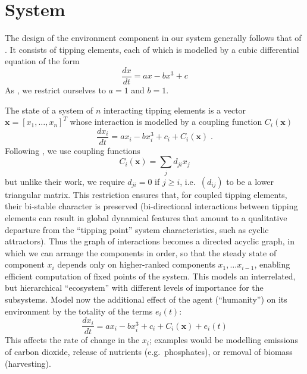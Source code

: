 \documentclass[letterpaper]{article}
\newcommand{\vectorsym}[1]{\ensuremath{\mathbf{#1}}}
\newcommand{\agentimpact}{\ensuremath{e}}
\begin{document}
\section{System}

The design of the environment component in our system generally
follows that of \citet{Klose2019_interactingtippingelements}. It consists of
tipping elements, each of which is modelled by a cubic differential equation of the
form
\begin{equation}
  \label{eq_cubic}
  \frac{dx}{dt} = ax - bx^3 + c
\end{equation}
As \citet{Klose2019_interactingtippingelements}, we restrict
ourselves to $a = 1$ and $b = 1$.

The state of a system of $n$ interacting tipping elements is a vector
$\vectorsym{x} = [x_1, \ldots, x_n]^T$ whose interaction
is  modelled by
 a coupling function $C_i(\vectorsym{x})$
\begin{equation}
  \label{eq_coupled}
  \frac{dx_i}{dt} = ax_i - bx_i^3 + c_i + C_i(\vectorsym{x})\;.
\end{equation}
Following \citet{Klose2019_interactingtippingelements}, we use coupling
functions
\begin{equation}
  \label{eq_couplingfunction}
  C_i(\vectorsym{x}) = \sum_j d_{ji} x_j
\end{equation}
but unlike their work, we require $d_{ji} = 0$ if $j \ge i$,
i.e.\ $(d_{ij})$ to be a lower triangular matrix. This restriction
ensures that, for coupled tipping elements, their bi-stable character
is preserved (bi-directional interactions between tipping elements can
result in global dynamical features that amount to a qualitative
departure from the ``tipping point'' system characteristics, such as
cyclic attractors). Thus the graph of interactions becomes a directed
acyclic graph, in which we can arrange the components in order, so
that the steady state of component $x_i$ depends only on higher-ranked
components $x_1, \ldots x_{i-1}$, enabling efficient computation of
fixed points of the system. This models an interrelated, but
hierarchical ``ecosystem'' with different levels of importance for the
subsystems.  Model now the additional effect of the agent
(``humanity'') on its environment by the totality of the terms
$\agentimpact_i(t)$:
\begin{equation}
  \label{eq_coupledwithagent}
  \frac{dx_i}{dt} = ax_i - bx_i^3 + c_i + C_i(\vectorsym{x}) + \agentimpact_i(t)
\end{equation}
This affects the rate of change in the $x_i$; examples would be modelling
emissions of carbon dioxide, release of nutrients
(e.g.\ phosphates), or removal of biomass (harvesting).
\end{document}
